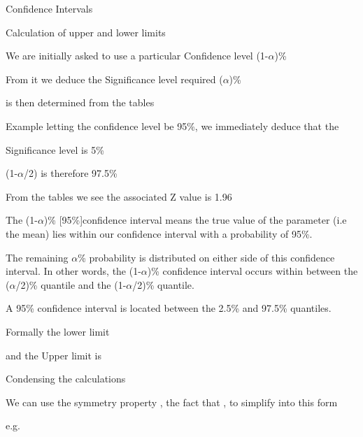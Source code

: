 \documentclass[a4paper,12pt]{article}
\begin{document}
\newpage


 

 

Confidence Intervals

Calculation of upper and lower limits 

We are initially asked to use a particular Confidence level (1-$\alpha$)\%  

From it we deduce the Significance level required   ($\alpha$)\%  

 is then determined from the tables

 

Example letting the confidence level be 95\%, we immediately deduce that the

Significance level is 5\%

 

(1-$\alpha$/2) is therefore 97.5\%

From the tables we see the associated Z value is 1.96

 

 

 

 

The (1-$\alpha$)\%  [95\%]confidence interval means the true value of the parameter (i.e the mean) lies within our confidence interval with a probability of 95\%.

 

The remaining $\alpha$\%  probability is distributed on either side of this confidence interval. In other words, the (1-$\alpha$)\%  confidence interval occurs within between the ($\alpha$/2)\% quantile and the (1-$\alpha$/2)\% quantile.

 

A 95\% confidence interval is located between the 2.5\% and 97.5\% quantiles.

 

Formally the lower limit 

and the Upper limit is 

 

Condensing the calculations

 

We can use the symmetry property , the fact that , to simplify into this form 

 

e.g. 

 
\end{document}
